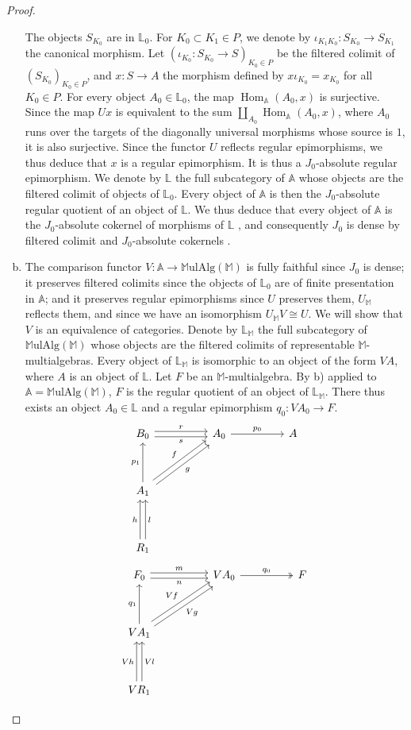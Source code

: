 \documentclass{article}
\newcommand{\bb}[1]{{\mathbb{#1}}}
\newcommand{\MulAlg}{\mathbb{M}\mathrm{ulAlg}}
\DeclareMathOperator{\Hom}{Hom}
\newcommand{\oldpage}[1]{\marginpar{\footnotesize$\Big\vert$ \textit{p.~#1}}}
\begin{document}
\begin{proof}
\begin{enumerate}[a)]
      The objects $S_{K_0}$ are in $\bb{L}_0$.
      For $K_0\subset K_1\in P$, we denote by $\iota_{K_1K_0}\colon S_{K_0}\to S_{K_1}$ the canonical morphism.
      Let $(\iota_{K_0}\colon S_{K_0}\to S)_{K_0\in P}$ be the filtered colimit of $(S_{K_0})_{K_0\in P}$, and $x\colon S\to A$ the morphism defined by $x\iota_{K_0}=x_{K_0}$ for all $K_0\in P$.
      For every object $A_0\in\bb{L}_0$, the map $\Hom_\bb{A}(A_0,x)$ is surjective.
      Since the map $Ux$ is equivalent to the sum $\coprod_{A_0}\Hom_\bb{A}(A_0,x)$, where $A_0$ runs over the targets of the diagonally universal morphisms whose source is $1$, it is also surjective.
      Since the functor $U$ reflects regular epimorphisms, we thus deduce that $x$ is a regular epimorphism.
      It is thus a $J_0$-absolute regular epimorphism.
      We denote by $\bb{L}$ the full subcategory of $\bb{A}$ whose objects are the filtered colimit of objects of $\bb{L}_0$.
      Every object of $\bb{A}$ is then the $J_0$-absolute regular quotient of an object of $\bb{L}$.
      We thus deduce that every object of $\bb{A}$ is the $J_0$-absolute cokernel of morphisms of $\bb{L}$ \cite[Lemma~5.6.1]{4}, and consequently $J_0$ is dense by filtered colimit and $J_0$-absolute cokernels \cite[Def.~2.0]{4}.
    \item The comparison functor $V\colon\bb{A}\to\MulAlg(\bb{M})$ is fully faithful since $J_0$ is dense;
      it preserves filtered colimits since the objects of $\bb{L}_0$ are of finite presentation in $\bb{A}$;
      and it preserves regular epimorphisms since $U$ preserves them, $U_\bb{M}$ reflects them, and since we have an isomorphism $U_\bb{M}V\cong U$.
      We will show that $V$ is an equivalence of categories.
      Denote by $\bb{L}_\bb{M}$ the full subcategory of $\MulAlg(\bb{M})$ whose objects are the filtered colimits of representable $\bb{M}$-multialgebras.
      Every object of $\bb{L}_\bb{M}$ is isomorphic to an object of the form $VA$, where $A$ is an object of $\bb{L}$.
      Let $F$ be an $\bb{M}$-multialgebra.
      By b) applied to $\bb{A}=\MulAlg(\bb{M})$, $F$ is the
\oldpage{203}
      regular quotient of an object of $\bb{L}_\bb{M}$.
      There thus exists an object $A_0\in\bb{L}$ and a regular epimorphism $q_0
      \colon VA_0\to F$.
      \[
        \begin{tikzcd}[sep=huge]
          B_0 \rar[shift left,"r"] \rar[shift right,swap,"s"]
          & A_0 \rar["p_0"]
          & A
        \\A_1 \uar["p_1"] \ar[ur,shift left,"f"] \ar[ur,shift right,swap,"g"]
        \\R_1 \uar[shift left,"h"] \uar[shift right,swap,"l"]
        \end{tikzcd}
      \]
      \[
        \begin{tikzcd}[sep=huge]
          F_0 \rar[shift left,"m"] \rar[shift right,swap,"n"]
          & VA_0 \rar[two heads,"q_0"]
          & F
        \\VA_1 \uar["q_1"] \ar[ur,shift left,"Vf"] \ar[ur,shift right,swap,"Vg"]
        \\VR_1 \uar[shift left,"Vh"] \uar[shift right,swap,"Vl"]
        \end{tikzcd}
      \]


\end{enumerate}
\end{proof}
\end{document}
